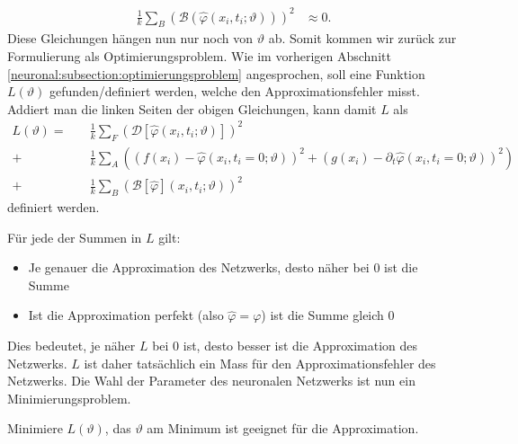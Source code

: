 \begin{equation}
    \begin{aligned}
        \frac{1}{k} \sum_{B}^{} \left(\mathcal{B}(\hat{\varphi}(x_i, t_i; \vartheta))\right)^2 &\approx 0.
    \end{aligned}
    \label{neuronal:randbedingung_umformuliert_netz_disk}
\end{equation}
Diese Gleichungen hängen nun nur noch von $\vartheta$ ab.
Somit kommen wir zurück zur Formulierung als Optimierungsproblem.
Wie im vorherigen Abschnitt \ref{neuronal:subsection:optimierungsproblem} angesprochen, soll eine Funktion $L(\vartheta)$ gefunden/definiert werden, welche den Approximationsfehler misst.
Addiert man die linken Seiten der obigen Gleichungen, kann damit \( L \) als
\begin{equation}
    \begin{aligned}
        L(\vartheta) =\quad &\frac{1}{k} \sum_{F}^{} \left(\mathcal{D}[\hat{\varphi}(x_i, t_i; \vartheta)]\right)^2\\
        + &\frac{1}{k} \sum_{A}^{} \left(\left(f(x_i) - \hat{\varphi}(x_i, t_i = 0; \vartheta)\right)^2
        + \left(g(x_i) - \partial_t \hat{\varphi}(x_i, t_i = 0; \vartheta)\right)^2\right)\\
        + &\frac{1}{k} \sum_{B}^{} \left(\mathcal{B}[\hat{\varphi}](x_i, t_i; \vartheta)\right)^2
    \end{aligned}
    \label{neuronal:optimierung}
\end{equation}
definiert werden.

Für jede der Summen in \( L \) gilt:
\begin{itemize}
    \item Je genauer die Approximation des Netzwerks, desto näher bei 0 ist die Summe
    \item Ist die Approximation perfekt (also \( \hat{\varphi} = \varphi \)) ist die Summe gleich 0
\end{itemize}
Dies bedeutet, je näher \( L \) bei 0 ist, desto besser ist die Approximation des Netzwerks.
$L$ ist daher tatsächlich ein Mass für den Approximationsfehler des Netzwerks.
Die Wahl der Parameter des neuronalen Netzwerks ist nun ein Minimierungsproblem.
\begin{aufgabe}
    Minimiere $L(\vartheta)$, das $\vartheta$ am Minimum ist geeignet für die Approximation.
\end{aufgabe}

